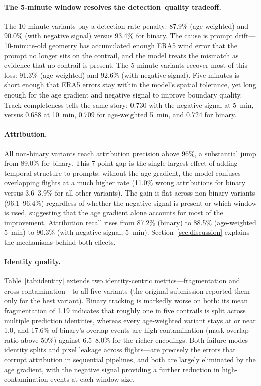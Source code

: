 \documentclass[review]{elsarticle}
\begin{document}
\paragraph{The 5-minute window resolves the detection--quality tradeoff.} The 10-minute variants pay a detection-rate penalty: 87.9\% (age-weighted) and 90.0\% (with negative signal) versus 93.4\% for binary. The cause is prompt drift---10-minute-old geometry has accumulated enough ERA5 wind error that the prompt no longer sits on the contrail, and the model treats the mismatch as evidence that no contrail is present. The 5-minute variants recover most of this loss: 91.3\% (age-weighted) and 92.6\% (with negative signal). Five minutes is short enough that ERA5 errors stay within the model's spatial tolerance, yet long enough for the age gradient and negative signal to improve boundary quality. Track completeness tells the same story: 0.730 with the negative signal at 5~min, versus 0.688 at 10~min, 0.709 for age-weighted 5~min, and 0.724 for binary.

\paragraph{Attribution.} All non-binary variants reach attribution precision above 96\%, a substantial jump from 89.0\% for binary. This 7-point gap is the single largest effect of adding temporal structure to prompts: without the age gradient, the model confuses overlapping flights at a much higher rate (11.0\% wrong attributions for binary versus 3.6--3.9\% for all other variants). The gain is flat across non-binary variants (96.1--96.4\%) regardless of whether the negative signal is present or which window is used, suggesting that the age gradient alone accounts for most of the improvement. Attribution recall rises from 87.2\% (binary) to 88.5\% (age-weighted 5~min) to 90.3\% (with negative signal, 5~min). Section~\ref{sec:discussion} explains the mechanisms behind both effects.

\paragraph{Identity quality.} Table~\ref{tab:identity} extends two identity-centric metrics---fragmentation and cross-contamination---to all five variants (the original submission reported them only for the best variant). Binary tracking is markedly worse on both: its mean fragmentation of 1.19 indicates that roughly one in five contrails is split across multiple prediction identities, whereas every age-weighted variant stays at or near 1.0, and 17.6\% of binary's overlap events are high-contamination (mask overlap ratio above 50\%) against 6.5--8.0\% for the richer encodings. Both failure modes---identity splits and pixel leakage across flights---are precisely the errors that corrupt attribution in sequential pipelines, and both are largely eliminated by the age gradient, with the negative signal providing a further reduction in high-contamination events at each window size.
\end{document}
